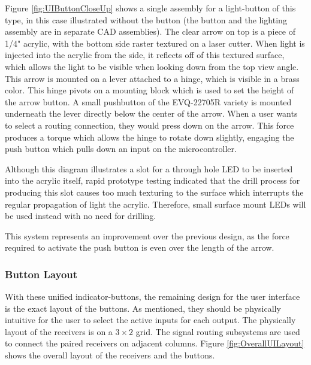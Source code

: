 \documentclass{article}
\begin{document}
	Figure \ref{fig:UIButtonCloseUp} shows a single assembly for a light-button of this type, in this case illustrated without the button (the button and the lighting assembly are in separate CAD assemblies).  The clear arrow on top is a piece of 1/4" acrylic, with the bottom side raster textured on a laser cutter.  When light is injected into the acrylic from the side, it reflects off of this textured surface, which allows the light to be visible when looking down from the top view angle.  This arrow is mounted on a lever attached to a hinge, which is visible in a brass color.  This hinge pivots on a mounting block which is used to set the height of the arrow button.  A small pushbutton of the EVQ-22705R \cite{EVQ-22705Rdatasheet} variety is mounted underneath the lever directly below the center of the arrow.  When a user wants to select a routing connection, they would press down on the arrow.  This force produces a torque which allows the hinge to rotate down slightly, engaging the push button which pulls down an input on the microcontroller.

	Although this diagram illustrates a slot for a through hole LED to be inserted into the acrylic itself, rapid prototype testing indicated that the drill process for producing this slot causes too much texturing to the surface which interrupts the regular propagation of light the acrylic.  Therefore, small surface mount LEDs will be used instead with no need for drilling.  

	This system represents an improvement over the previous design, as the force required to activate the push button is even over the length of the arrow.  

	\color{gray}

	\subsubsection{Button Layout}

	With these unified indicator-buttons, the remaining design for the user interface is the exact layout of the buttons.  As mentioned, they should be physically intuitive for the user to select the active inputs for each output.  The physically layout of the receivers is on a $3 \times 2$ grid.  The signal routing subsystems are used to connect the paired receivers on adjacent columns.  Figure \ref{fig:OverallUILayout} shows the overall layout of the receivers and the buttons.
\end{document}
